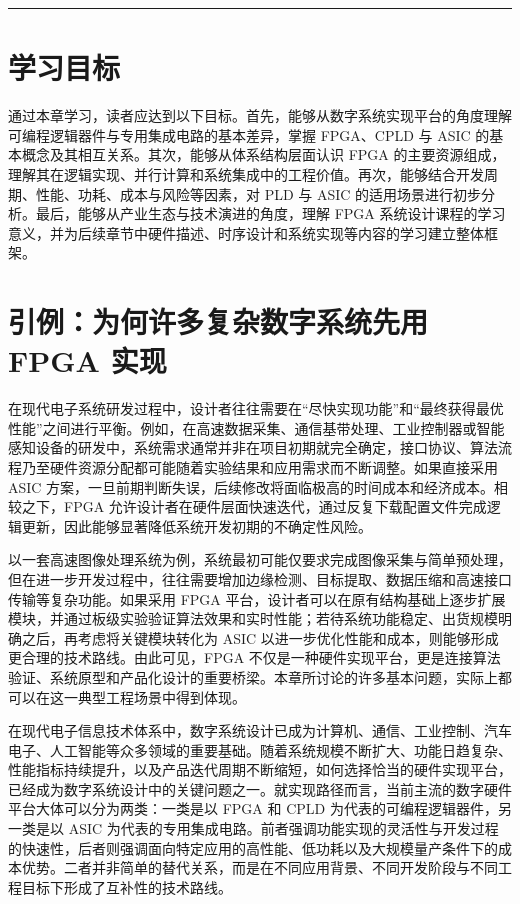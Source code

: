 \begin{center}\rule{0.5\linewidth}{0.5pt}\end{center}

\section{学习目标}\label{ux5b66ux4e60ux76eeux6807}

通过本章学习，读者应达到以下目标。首先，能够从数字系统实现平台的角度理解可编程逻辑器件与专用集成电路的基本差异，掌握
FPGA、CPLD 与 ASIC 的基本概念及其相互关系。其次，能够从体系结构层面认识
FPGA
的主要资源组成，理解其在逻辑实现、并行计算和系统集成中的工程价值。再次，能够结合开发周期、性能、功耗、成本与风险等因素，对
PLD 与 ASIC
的适用场景进行初步分析。最后，能够从产业生态与技术演进的角度，理解 FPGA
系统设计课程的学习意义，并为后续章节中硬件描述、时序设计和系统实现等内容的学习建立整体框架。

\section{引例：为何许多复杂数字系统先用 FPGA
实现}\label{ux5f15ux4f8bux4e3aux4f55ux8bb8ux591aux590dux6742ux6570ux5b57ux7cfbux7edfux5148ux7528-fpga-ux5b9eux73b0}

在现代电子系统研发过程中，设计者往往需要在``尽快实现功能''和``最终获得最优性能''之间进行平衡。例如，在高速数据采集、通信基带处理、工业控制器或智能感知设备的研发中，系统需求通常并非在项目初期就完全确定，接口协议、算法流程乃至硬件资源分配都可能随着实验结果和应用需求而不断调整。如果直接采用
ASIC
方案，一旦前期判断失误，后续修改将面临极高的时间成本和经济成本。相较之下，FPGA
允许设计者在硬件层面快速迭代，通过反复下载配置文件完成逻辑更新，因此能够显著降低系统开发初期的不确定性风险。

以一套高速图像处理系统为例，系统最初可能仅要求完成图像采集与简单预处理，但在进一步开发过程中，往往需要增加边缘检测、目标提取、数据压缩和高速接口传输等复杂功能。如果采用
FPGA
平台，设计者可以在原有结构基础上逐步扩展模块，并通过板级实验验证算法效果和实时性能；若待系统功能稳定、出货规模明确之后，再考虑将关键模块转化为
ASIC 以进一步优化性能和成本，则能够形成更合理的技术路线。由此可见，FPGA
不仅是一种硬件实现平台，更是连接算法验证、系统原型和产品化设计的重要桥梁。本章所讨论的许多基本问题，实际上都可以在这一典型工程场景中得到体现。

在现代电子信息技术体系中，数字系统设计已成为计算机、通信、工业控制、汽车电子、人工智能等众多领域的重要基础。随着系统规模不断扩大、功能日趋复杂、性能指标持续提升，以及产品迭代周期不断缩短，如何选择恰当的硬件实现平台，已经成为数字系统设计中的关键问题之一。就实现路径而言，当前主流的数字硬件平台大体可以分为两类：一类是以
FPGA 和 CPLD 为代表的可编程逻辑器件，另一类是以 ASIC
为代表的专用集成电路。前者强调功能实现的灵活性与开发过程的快速性，后者则强调面向特定应用的高性能、低功耗以及大规模量产条件下的成本优势。二者并非简单的替代关系，而是在不同应用背景、不同开发阶段与不同工程目标下形成了互补性的技术路线。

